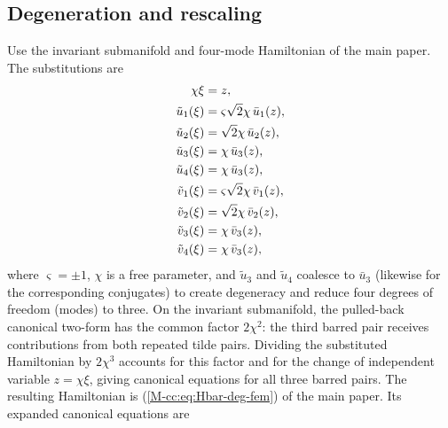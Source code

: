 \documentclass[11pt,a4paper]{article}
\newcommand{\externaleqref}[1]{\textup{(\ref*{#1})}}
\begin{document}
\subsection{Degeneration and rescaling}
Use the invariant submanifold and four-mode Hamiltonian of the main paper. The substitutions are
\begin{align}
  \chi\xi &= z, \notag \\
  \tilde{u}_1(\xi) &= \varsigma \sqrt{2}\chi \,\bar{u}_1(z), \notag \\
  \tilde{u}_2(\xi) &= \sqrt{2} \chi  \,\bar{u}_2(z), \notag \\
  \tilde{u}_3(\xi) &= \chi  \,\bar{u}_3(z), \notag \\
  \tilde{u}_4(\xi) &= \chi  \,\bar{u}_3(z), \notag \\
  \tilde{v}_1(\xi) &= \varsigma \sqrt{2} \chi  \,\bar{v}_1(z), \notag \\
  \tilde{v}_2(\xi) &= \sqrt{2} \chi  \,\bar{v}_2(z), \notag \\
  \tilde{v}_3(\xi) &= \chi  \,\bar{v}_3(z), \notag \\
  \tilde{v}_4(\xi) &= \chi  \,\bar{v}_3(z), \notag \\
\end{align}
where $\varsigma = \pm 1$, $\chi$ is a free parameter, and $\tilde{u}_3$ and $\tilde{u}_4$ coalesce to $\bar{u}_3$ (likewise for the corresponding conjugates) to create degeneracy and reduce four degrees of freedom (modes) to three.
On the invariant submanifold, the pulled-back canonical two-form has the common factor $2\chi^2$: the third barred pair receives contributions from both repeated tilde pairs.
Dividing the substituted Hamiltonian by $2\chi^3$ accounts for this factor and for the change of independent variable $z=\chi\xi$, giving canonical equations for all three barred pairs.
The resulting Hamiltonian is \externaleqref{M-cc:eq:Hbar-deg-fem} of the main paper. Its expanded canonical equations are
\end{document}

